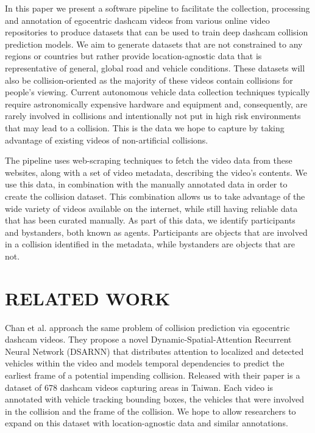 \documentclass[letterpaper, 10 pt, conference]{IEEEconf}
\begin{document}
In this paper we present a software pipeline to facilitate the collection, processing and annotation of egocentric dashcam videos from various online video repositories to produce datasets that can be used to train deep dashcam collision prediction models.
We aim to generate datasets that are not constrained to any regions or countries but rather provide location-agnostic data that is representative of general, global road and vehicle conditions.
These datasets will also be collision-oriented as the majority of these videos contain collisions for people's viewing.
Current autonomous vehicle data collection techniques typically require astronomically expensive hardware and equipment and, consequently, are rarely involved in collisions and intentionally not put in high risk environments that may lead to a collision.
This is the data we hope to capture by taking advantage of existing videos of non-artificial collisions.

The pipeline uses web-scraping techniques to fetch the video data from these websites, along with a set of video metadata, describing the video's contents.
We use this data, in combination with the manually annotated data in order to create the collision dataset.
This combination allows us to take advantage of the wide variety of videos available on the internet, while still having reliable data that has been curated manually.
As part of this data, we identify participants and bystanders, both known as agents. Participants are objects that are involved in a collision identified in the metadata, while bystanders are objects that are not.

\section{RELATED WORK}

Chan et al. \cite{chan2016anticipating} approach the same problem of collision prediction via egocentric dashcam videos. They propose a novel Dynamic-Spatial-Attention Recurrent Neural Network (DSARNN) that distributes attention to localized and detected vehicles within the video and models temporal dependencies to predict the earliest frame of a potential impending collision. Released with their paper is a dataset of 678 dashcam videos capturing areas in Taiwan. Each video is annotated with vehicle tracking bounding boxes, the vehicles that were involved in the collision and the frame of the collision. We hope to allow researchers to expand on this dataset with location-agnostic data and similar annotations.
\end{document}
